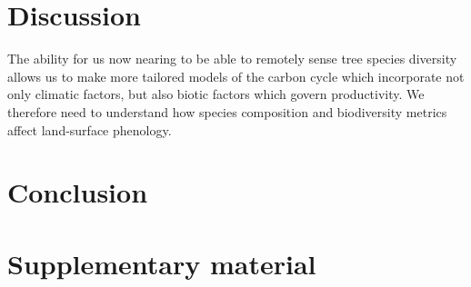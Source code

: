 \documentclass[11pt,a4paper]{article}
\begin{document}
\section{Discussion}

The ability for us now nearing to be able to remotely sense tree species diversity allows us to make more tailored models of the carbon cycle which incorporate not only climatic factors, but also biotic factors which govern productivity. We therefore need to understand how species composition and biodiversity metrics affect land-surface phenology. 

\section{Conclusion}

\printbibliography

\section{Supplementary material}


\end{document}
